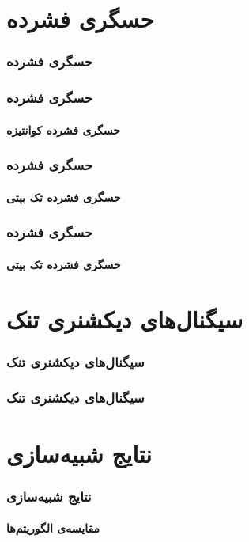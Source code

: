 \begin{frame}
\tableofcontents
\end{frame}


\section{حسگری فشرده\hfill}

\begin{frame}
\frametitle{حسگری فشرده}

\end{frame}

\begin{frame}
\frametitle{حسگری فشرده}
\framesubtitle{حسگری فشرده کوانتیزه}
\end{frame}

\begin{frame}
\frametitle{حسگری فشرده}
\framesubtitle{حسگری فشرده تک بیتی}
\end{frame}

\begin{frame}
\frametitle{حسگری فشرده}
\framesubtitle{حسگری فشرده تک بیتی}
\end{frame}


\section{سیگنال‌های دیکشنری تنک\hfill}

\begin{frame}
\frametitle{سیگنال‌های دیکشنری تنک}

\end{frame}

\begin{frame}
\frametitle{سیگنال‌های دیکشنری تنک}

\end{frame}



\section{نتایج شبیه‌سازی\hfill}

\begin{frame}
\frametitle{نتایج شبیه‌سازی}
\framesubtitle{مقایسه‌ی الگوریتم‌ها}
\end{frame}

